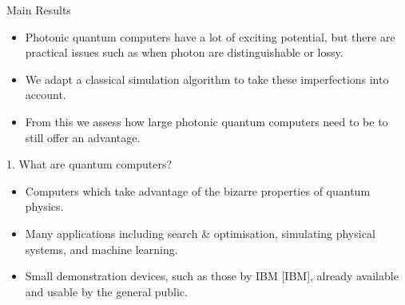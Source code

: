 \documentclass[]{templates/poster}
\begin{document}

\begin{frame}{} 

\begin{columns}[t]
  \begin{column}{0.422\linewidth}
  \begin{block}{\Large Main Results}
  \begin{itemize}
  \item Photonic quantum computers have a lot of exciting potential, but there are practical issues such as when photon are distinguishable or lossy.
  
  \item We adapt a classical simulation algorithm to take these imperfections into account.
  
  \item From this we assess how large photonic quantum computers need to be to still offer an advantage.
  \end{itemize}
  \end{block}

  \begin{block}{\Large 1. What are quantum computers?}
  \begin{itemize}
  \item Computers which take advantage of the bizarre properties of quantum physics.
  \item Many applications including search \& optimisation, simulating physical systems, and machine learning.
  \item Small demonstration devices, such as those by IBM [IBM], already available and usable by the general public.
  \end{itemize}
  \end{block}


\end{column}
\end{columns}
\end{frame}
\end{document}
